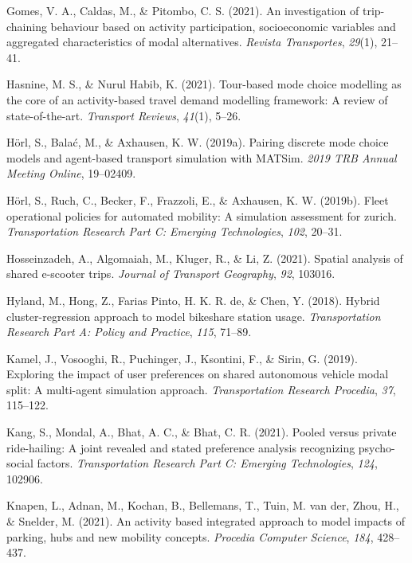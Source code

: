 \documentclass[fancy, masters]{byuthesis}
\newlength{\cslhangindent}
\newlength{\cslentryspacingunit} %
\newenvironment{CSLReferences}[2] %
 {%
  \setlength{\parindent}{0pt}
  \ifodd #1
  \let\oldpar\par
  \def\par{\hangindent=\cslhangindent\oldpar}
  \fi
  \setlength{\parskip}{#2\cslentryspacingunit}
 }%
 {}
\begin{document}
\begin{CSLReferences}{1}{0}
\leavevmode{}%
Gomes, V. A., Caldas, M., \& Pitombo, C. S. (2021). An investigation of trip-chaining behaviour based on activity participation, socioeconomic variables and aggregated characteristics of modal alternatives. \emph{Revista Transportes}, \emph{29}(1), 21--41.

\leavevmode{}%
Hasnine, M. S., \& Nurul Habib, K. (2021). Tour-based mode choice modelling as the core of an activity-based travel demand modelling framework: A review of state-of-the-art. \emph{Transport Reviews}, \emph{41}(1), 5--26.

\leavevmode{}%
Hörl, S., Balać, M., \& Axhausen, K. W. (2019a). Pairing discrete mode choice models and agent-based transport simulation with MATSim. \emph{2019 TRB Annual Meeting Online}, 19--02409.

\leavevmode{}%
Hörl, S., Ruch, C., Becker, F., Frazzoli, E., \& Axhausen, K. W. (2019b). Fleet operational policies for automated mobility: A simulation assessment for zurich. \emph{Transportation Research Part C: Emerging Technologies}, \emph{102}, 20--31.

\leavevmode{}%
Hosseinzadeh, A., Algomaiah, M., Kluger, R., \& Li, Z. (2021). Spatial analysis of shared e-scooter trips. \emph{Journal of Transport Geography}, \emph{92}, 103016.

\leavevmode{}%
Hyland, M., Hong, Z., Farias Pinto, H. K. R. de, \& Chen, Y. (2018). Hybrid cluster-regression approach to model bikeshare station usage. \emph{Transportation Research Part A: Policy and Practice}, \emph{115}, 71--89.

\leavevmode{}%
Kamel, J., Vosooghi, R., Puchinger, J., Ksontini, F., \& Sirin, G. (2019). Exploring the impact of user preferences on shared autonomous vehicle modal split: A multi-agent simulation approach. \emph{Transportation Research Procedia}, \emph{37}, 115--122.

\leavevmode{}%
Kang, S., Mondal, A., Bhat, A. C., \& Bhat, C. R. (2021). Pooled versus private ride-hailing: A joint revealed and stated preference analysis recognizing psycho-social factors. \emph{Transportation Research Part C: Emerging Technologies}, \emph{124}, 102906.

\leavevmode{}%
Knapen, L., Adnan, M., Kochan, B., Bellemans, T., Tuin, M. van der, Zhou, H., \& Snelder, M. (2021). An activity based integrated approach to model impacts of parking, hubs and new mobility concepts. \emph{Procedia Computer Science}, \emph{184}, 428--437.


\end{CSLReferences}
\end{document}
